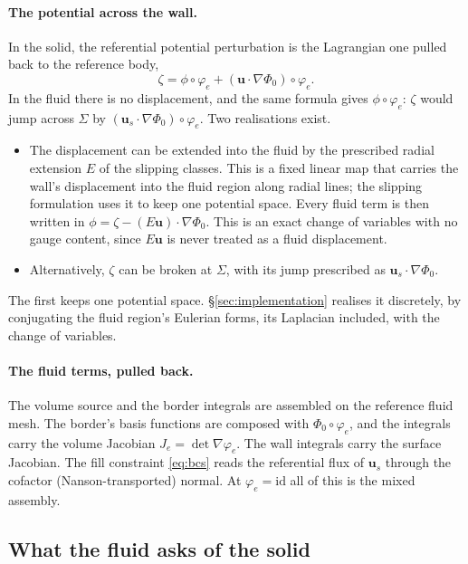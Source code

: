 \documentclass[11pt]{article}
\theoremstyle{definition}
\theoremstyle{remark}
\newcommand{\bu}{\mathbf{u}}
\begin{document}
\paragraph{The potential across the wall.} In the solid, the
referential potential perturbation is the Lagrangian one pulled back
to the reference body,
\begin{equation*}
  \zeta = \phi\circ\varphi_e + (\bu\cdot\nabla\Phi_0)\circ\varphi_e .
\end{equation*}
In the fluid there is no displacement, and the same formula gives
$\phi\circ\varphi_e$: $\zeta$ would jump across $\Sigma$ by
$(\bu_s\cdot\nabla\Phi_0)\circ\varphi_e$. Two realisations exist.
\begin{itemize}
\item The displacement can be extended into the fluid by the
  prescribed radial extension $E$ of the slipping classes. This is a
  fixed linear map that carries the wall's displacement into the
  fluid region along radial lines; the slipping formulation uses it
  to keep one potential space. Every fluid term is then written in
  $\phi = \zeta - (E\bu)\cdot\nabla\Phi_0$. This is an exact change of
  variables with no gauge content, since $E\bu$ is never treated as a
  fluid displacement.
\item Alternatively, $\zeta$ can be broken at $\Sigma$, with its jump
  prescribed as $\bu_s\cdot\nabla\Phi_0$.
\end{itemize}
The first keeps one potential space. \S\ref{sec:implementation}
realises it discretely, by conjugating the fluid region's Eulerian
forms, its Laplacian included, with the change of variables.

\paragraph{The fluid terms, pulled back.} The volume source and the
border integrals are assembled on the reference fluid mesh. The
border's basis functions are composed with $\Phi_0\circ\varphi_e$, and
the integrals carry the volume Jacobian $J_e = \det\nabla\varphi_e$.
The wall integrals carry the surface Jacobian. The fill
constraint \eqref{eq:bcs} reads the referential flux of $\bu_s$ through the
cofactor (Nanson-transported) normal. At $\varphi_e = \mathrm{id}$ all
of this is the mixed assembly.

\subsection{What the fluid asks of the solid}
\label{sec:solid-asks}
\end{document}
